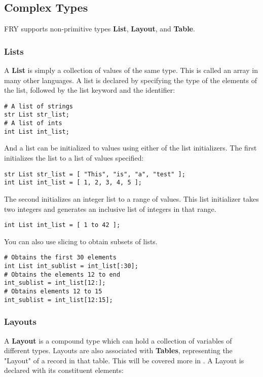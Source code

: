 \documentclass{article}
\begin{document}
\subsection{Complex Types}
FRY supports non-primitive types \textbf{List}, \textbf{Layout}, and \textbf{Table}. 
\subsubsection{Lists}
A \textbf{List} is simply a collection of values of the same type. This is called an array in many other languages. A list is declared by specifying the type of the elements of the list, followed by the list keyword and the identifier:

\begin{lstlisting}
# A list of strings
str List str_list;
# A list of ints
int List int_list;
\end{lstlisting}

And a list can be initialized to values using either of the list initializers. The first initializes the list to a list of values specified:

\begin{lstlisting}
str List str_list = [ "This", "is", "a", "test" ]; 
int List int_list = [ 1, 2, 3, 4, 5 ];
\end{lstlisting}

The second initializes an integer list to a range of values. This list initializer takes two integers and generates an inclusive list of integers in that range.

\begin{lstlisting}
int List int_list = [ 1 to 42 ];
\end{lstlisting}

You can also use slicing to obtain subsets of lists. 

\begin{lstlisting}
# Obtains the first 30 elements
int List int_sublist = int_list[:30]; 
# Obtains the elements 12 to end
int_sublist = int_list[12:];
# Obtains elements 12 to 15
int_sublist = int_list[12:15];
\end{lstlisting}

\subsubsection{Layouts}
A \textbf{Layout} is a compound type which can hold a collection of variables of different types. Layouts are also associated with \textbf{Tables}, representing the "Layout" of a record in that table. This will be covered more in \label{sec:Tables}.
A Layout is declared with its constituent elements:
\end{document}
